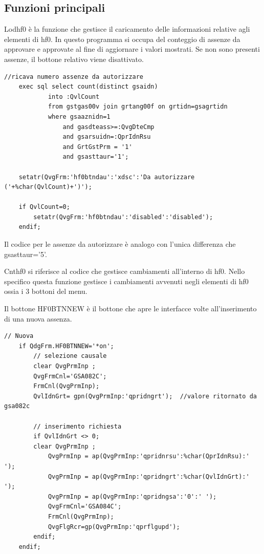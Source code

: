 \documentclass[target=bach,aauheader=,style=]{thud}
\begin{document}
\subsection{Funzioni principali}
Lodhf0 è la funzione che gestisce il caricamento delle informazioni relative agli elementi di hf0.
In questo programma si occupa del conteggio di assenze da approvare e approvate al fine di aggiornare i valori mostrati. Se non sono presenti assenze, il bottone relativo viene disattivato.


\begin{lstlisting}[language=RPG, caption=Codice RPG di Lodhf0, label=lst:rpgHF0BTNNEW]
    //ricava numero assenze da autorizzare
    exec sql select count(distinct gsaidn)
            into :QvlCount
            from gstgas00v join grtang00f on grtidn=gsagrtidn
            where gsaaznidn=1
                and gasdteass>=:QvgDteCmp
                and gsarsuidn=:QprIdnRsu
                and GrtGstPrm = '1'
                and gsasttaur='1';

    setatr(QvgFrm:'hf0btndau':'xdsc':'Da autorizzare ('+%char(QvlCount)+')');

    if QvlCount=0;
        setatr(QvgFrm:'hf0btndau':'disabled':'disabled');
    endif;
\end{lstlisting}

Il codice per le assenze da autorizzare è analogo con l'unica differenza che gsasttaur='5'.


Cnthf0 si riferisce al codice che gestisce cambiamenti all'interno di hf0.
Nello specifico questa funzione gestisce i cambiamenti avvenuti negli elementi di hf0 ossia i 3 bottoni del menu.

Il bottone HF0BTNNEW è il bottone che apre le interfacce volte all'inserimento di una nuova assenza.
\begin{lstlisting}[language=RPG, caption=Codice RPG del bottone HF0BTNNEW, label=lst:rpgHF0BTNNEW]
    // Nuova
    if QdgFrm.HF0BTNNEW='*on';
        // selezione causale
        clear QvgPrmInp ;
        QvgFrmCnl='GSA082C';
        FrmCnl(QvgPrmInp);
        QvlIdnGrt= gpn(QvgPrmInp:'qpridngrt');  //valore ritornato da gsa082c

        // inserimento richiesta
        if QvlIdnGrt <> 0;
        clear QvgPrmInp ;
            QvgPrmInp = ap(QvgPrmInp:'qpridnrsu':%char(QprIdnRsu):' ');
            QvgPrmInp = ap(QvgPrmInp:'qpridngrt':%char(QvlIdnGrt):' ');
            QvgPrmInp = ap(QvgPrmInp:'qpridngsa':'0':' ');
            QvgFrmCnl='GSA084C';
            FrmCnl(QvgPrmInp);
            QvgFlgRcr=gp(QvgPrmInp:'qprflgupd');
        endif;
    endif;
\end{lstlisting}
\end{document}
